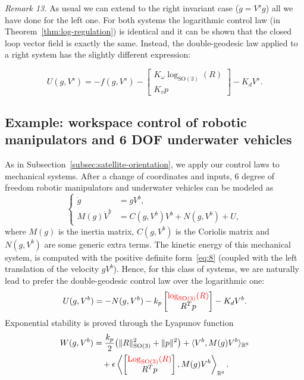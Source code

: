 \documentclass[10pt,twocolumn]{article}
\newcommand{\rev}[1]{\textcolor{red}{#1}}
\newcommand{\Log}{\operatorname{Log}}
\newcommand{\SO}{\mathrm{SO}}
\newcommand{\R}{\mathbb R}
\newcounter{paperitem}
\newcommand{\paperhead}[3]{\refstepcounter{paperitem}\par\medskip\noindent\textit{#1}\label{#3} #2\par}
\begin{document}
\paperhead{Remark 13.}{As usual we can extend to the right invariant case ($\dot g=V^s g$) all we have done for the left one. For both systems the logarithmic control law (in Theorem~\ref{thm:log-regulation}) is identical and it can be shown that the closed loop vector field is exactly the same. Instead, the double-geodesic law applied to a right system has the slightly different expression:}{rem:right-invariant}
\begin{equation*}
U(g,V^s)=-f(g,V^s)-
\begin{bmatrix}
K_\omega\log_{\SO(3)}(R)\\
K_vp
\end{bmatrix}-K_dV^s.
\end{equation*}

\subsection{Example: workspace control of robotic manipulators and 6 DOF underwater vehicles}\label{subsec:workspace-control}
As in Subsection~\ref{subsec:satellite-orientation}, we apply our control laws to mechanical systems. After a change of coordinates and inputs, 6 degree of freedom robotic manipulators and underwater vehicles can be modeled as
\begin{equation*}
\left\{\begin{aligned}
\dot g&=gV^b,\\
M(g)\dot V^b&=C(g,V^b)V^b+N(g,V^b)+U,
\end{aligned}\right.
\end{equation*}
where $M(g)$ is the inertia matrix, $C(g,V^b)$ is the Coriolis matrix and $N(g,V^b)$ are some generic extra terms. The kinetic energy of this mechanical system, is computed with the positive definite form~\eqref{eq:8} (coupled with the left translation of the velocity $gV^b$). Hence, for this class of systems, we are naturally lead to prefer the double-geodesic control law over the logarithmic one:
\begin{equation*}
U(g,V^b)=-N(g,V^b)-k_p
\begin{bmatrix}
\rev{\log_{\SO(3)}(R)}\\
R^Tp
\end{bmatrix}-K_dV^b.
\end{equation*}
Exponential stability is proved through the Lyapunov function
\begin{align*}
W(g,V^b)&=\frac{k_p}{2}\bigl(\|R\|_{\SO(3)}^2+\|p\|^2\bigr)
+\langle V^b,M(g)V^b\rangle_{\R^6}\\
&\quad+\epsilon\left\langle
\begin{bmatrix}\rev{\Log_{\SO(3)}(R)}\\R^Tp\end{bmatrix},
M(g)V^b
\right\rangle_{\R^6}.
\end{align*}
\end{document}
